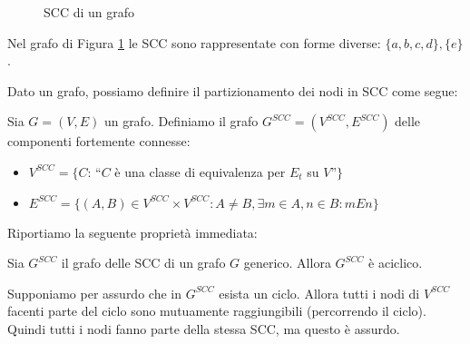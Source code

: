\begin{example}
    \begin{figure}[t]
        \centering
        \caption{SCC di un grafo}
        \label{fig:graph_cfc_1}
    \end{figure}
    Nel grafo di Figura \ref{fig:graph_cfc_1} le SCC sono rappresentate con forme diverse: $\{a,b,c,d\}, \{e\}$.
\end{example}
Dato un grafo, possiamo definire il partizionamento dei nodi in SCC come segue:
\begin{definition}
    Sia $G = (V, E)$ un grafo. Definiamo il grafo $G^{SCC} = (V^{SCC}, E^{SCC})$ delle componenti fortemente connesse:
    \begin{itemize}
        \item $V^{SCC} = \{C : \,$``$C$ è una classe di equivalenza per $E_t$ su $V$''$\}$
        \item $E^{SCC} = \{(A,B) \in V^{SCC} \times V^{SCC} : A \neq B, \exists m \in A, n \in B : m E n\}$
    \end{itemize}
\end{definition}
Riportiamo la seguente proprietà immediata:
\begin{proposition}
    Sia $G^{SCC}$ il grafo delle SCC di un grafo $G$ generico. Allora $G^{SCC}$ è aciclico.
\end{proposition}
\begin{proof2}
    Supponiamo per assurdo che in $G^{SCC}$ esista un ciclo. Allora tutti i nodi di $V^{SCC}$ facenti parte del ciclo sono mutuamente raggiungibili (percorrendo il ciclo). Quindi tutti i nodi fanno parte della stessa SCC, ma questo è assurdo.
\end{proof2}
